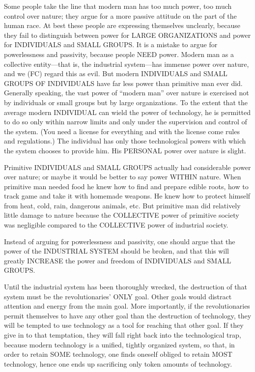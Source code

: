  Some people take the line that modern man has too much power, too much control over nature; they argue for a more passive attitude on the part of the human race. At best these people are expressing themselves unclearly, because they fail to distinguish between power for LARGE ORGANIZATIONS and power for INDIVIDUALS and SMALL GROUPS. It is a mistake to argue for powerlessness and passivity, because people NEED power. Modern man as a collective entity—that is, the industrial system—has immense power over nature, and we (FC) regard this as evil. But modern INDIVIDUALS and SMALL GROUPS OF INDIVIDUALS have far less power than primitive man ever did. Generally speaking, the vast power of “modern man” over nature is exercised not by individuals or small groups but by large organizations. To the extent that the average modern INDIVIDUAL can wield the power of technology, he is permitted to do so only within narrow limits and only under the supervision and control of the system. (You need a license for everything and with the license come rules and regulations.) The individual has only those technological powers with which the system chooses to provide him. His PERSONAL power over nature is slight.

 Primitive INDIVIDUALS and SMALL GROUPS actually had considerable power over nature; or maybe it would be better to say power WITHIN nature. When primitive man needed food he knew how to find and prepare edible roots, how to track game and take it with homemade weapons. He knew how to protect himself from heat, cold, rain, dangerous animals, etc. But primitive man did relatively little damage to nature because the COLLECTIVE power of primitive society was negligible compared to the COLLECTIVE power of industrial society.

 Instead of arguing for powerlessness and passivity, one should argue that the power of the INDUSTRIAL SYSTEM should be broken, and that this will greatly INCREASE the power and freedom of INDIVIDUALS and SMALL GROUPS.

 Until the industrial system has been thoroughly wrecked, the destruction of that system must be the revolutionaries’ ONLY goal. Other goals would distract attention and energy from the main goal. More importantly, if the revolutionaries permit themselves to have any other goal than the destruction of technology, they will be tempted to use technology as a tool for reaching that other goal. If they give in to that temptation, they will fall right back into the technological trap, because modern technology is a unified, tightly organized system, so that, in order to retain SOME technology, one finds oneself obliged to retain MOST technology, hence one ends up sacrificing only token amounts of technology.

